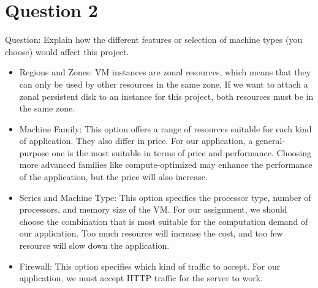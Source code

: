 \documentclass{article}
\begin{document}
\section{Question 2}
Question: Explain how the different features or selection of machine types (you choose) would affect this project.\\
\begin{itemize}
    \item Regions and Zones: VM instances are zonal resources, which means that they can only be used by other resources in the same zone. If we want to attach a zonal persistent disk to an instance for this project, both resources must be in the same zone.
    \item Machine Family: This option offers a range of resources suitable for each kind of application. They also differ in price. For our application, a general-purpose one is the most suitable in terms of price and performance. Choosing more advanced families like compute-optimized may enhance the performance of the application, but the price will also increase. 
    \item Series and Machine Type: This option specifies the processor type, number of processors, and memory size of the VM. For our assignment, we should choose the combination that is most suitable for the computation demand of our application. Too much resource will increase the cost, and too few resource will slow down the application.
    \item Firewall: This option specifies which kind of traffic to accept. For our application, we must accept HTTP traffic for the server to work.
\end{itemize}
\end{document}
